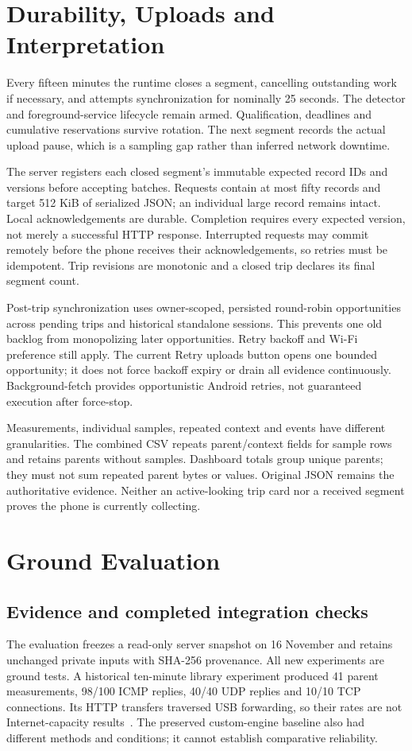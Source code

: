 \section{Durability, Uploads and Interpretation}
Every fifteen minutes the runtime closes a segment, cancelling outstanding work
if necessary, and attempts synchronization for nominally 25 seconds. The detector
and foreground-service lifecycle remain armed. Qualification, deadlines and
cumulative reservations survive rotation. The next segment records the actual
upload pause, which is a sampling gap rather than inferred network downtime.

The server registers each closed segment's immutable expected record IDs and
versions before accepting batches. Requests contain at most fifty records and
target 512 KiB of serialized JSON; an individual large record remains intact.
Local acknowledgements are durable. Completion requires every expected version,
not merely a successful HTTP response. Interrupted requests may commit remotely
before the phone receives their acknowledgements, so retries must be idempotent.
Trip revisions are monotonic and a closed trip declares its final segment count.

Post-trip synchronization uses owner-scoped, persisted round-robin opportunities
across pending trips and historical standalone sessions. This prevents one old
backlog from monopolizing later opportunities. Retry backoff and Wi-Fi preference
still apply. The current Retry uploads button opens one bounded opportunity; it
does not force backoff expiry or drain all evidence continuously. Background-fetch
provides opportunistic Android retries, not guaranteed execution after force-stop.

Measurements, individual samples, repeated context and events have different
granularities. The combined CSV repeats parent/context fields for sample rows
and retains parents without samples. Dashboard totals group unique parents;
they must not sum repeated parent bytes or values. Original JSON remains the
authoritative evidence. Neither an active-looking trip card nor a received
segment proves the phone is currently collecting.

\section{Ground Evaluation}
\subsection{Evidence and completed integration checks}
The evaluation freezes a read-only server snapshot on 16 November and retains
unchanged private inputs with SHA-256 provenance. All new experiments are ground
tests. A historical ten-minute library experiment produced 41 parent measurements,
98/100 ICMP replies, 40/40 UDP replies and 10/10 TCP connections. Its HTTP
transfers traversed USB forwarding, so their rates are not Internet-capacity
results~\cite{artifact}. The preserved custom-engine baseline also had different
methods and conditions; it cannot establish comparative reliability.

